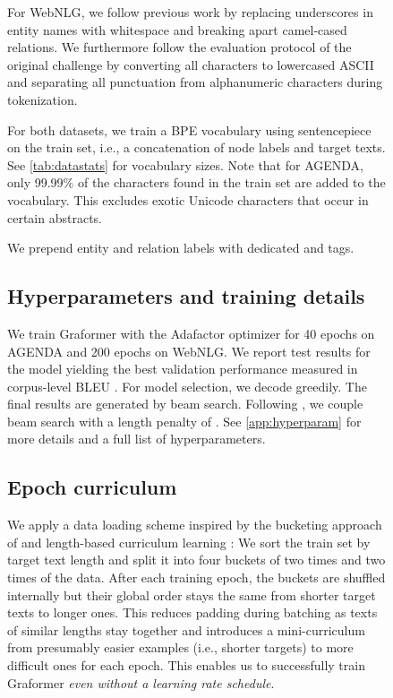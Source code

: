 \documentclass[11pt]{article}
\begin{document}
\begin{figure}
\begin{tabular}
For {WebNLG},
we follow previous work \citep{gardent-etal-2017-webnlg}
by replacing underscores in entity names with whitespace
and breaking apart camel-cased relations.
We furthermore follow the evaluation protocol of the original challenge
by converting all characters to lowercased ASCII and
separating all punctuation from alphanumeric characters during tokenization.

For both datasets,
we train a BPE vocabulary using sentencepiece \citep{kudo-richardson-2018-sentencepiece}
on the
train set,
i.e., a concatenation of node labels and target texts.
See \cref{tab:datastats} for vocabulary sizes.
Note that for AGENDA,
only 99.99\%{} of the characters found in the train set
are added to the vocabulary.
This excludes exotic Unicode characters that occur in certain abstracts.

We prepend entity and relation labels with dedicated  and  tags.

\subsection{Hyperparameters and training details}
We train Graformer with the Adafactor optimizer \citep{adafactor}
for 40 epochs on AGENDA and 200 epochs on WebNLG.
We report test results for the model yielding the best validation performance measured in corpus-level BLEU \citep{papineni-etal-2002-bleu}.
For model selection,
we decode greedily.
The final results are generated by beam search.
Following \citet{ribeiro20},
we couple beam search with a length penalty \citep{wu16} of .
See \cref{app:hyperparam} for more details and a full list of hyperparameters.


\subsection{Epoch curriculum}
We apply a data loading scheme inspired by the bucketing approach of \citet{koncel-kedziorski-etal-2019-text}
and length-based curriculum learning \citep{platanios-etal-2019-competence}:
We sort the train set by target text length and split it into four buckets of two times  and two times  of the data.
After each training epoch, the buckets are shuffled internally
but their global order stays the same from shorter target texts to longer ones.
This reduces padding during batching as texts of similar lengths stay together
and introduces a mini-curriculum from presumably easier examples (i.e., shorter targets) to more difficult ones
for each epoch.
This enables us to successfully train Graformer \textit{even without a learning rate schedule}.


\end{tabular}
\end{figure}
\end{document}
